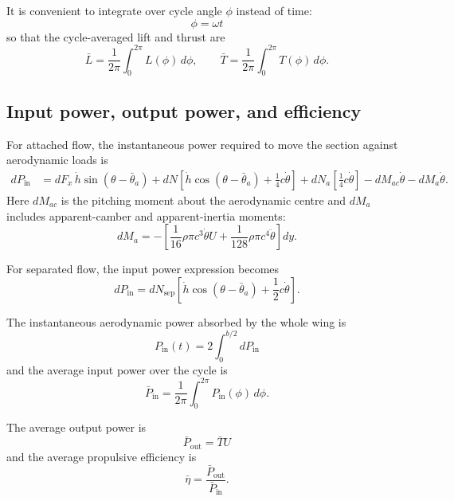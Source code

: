 \documentclass[11pt,a4paper]{article}
\begin{document}
It is convenient to integrate over cycle angle $\phi$ instead of time:
\begin{equation}
\phi=\omega t
\tag{33}\label{eq:33}
\end{equation}
so that the cycle-averaged lift and thrust are
\begin{equation}
\bar{L}=\frac{1}{2\pi}\int_{0}^{2\pi}L(\phi)\,d\phi,\qquad
\bar{T}=\frac{1}{2\pi}\int_{0}^{2\pi}T(\phi)\,d\phi.
\tag{34}\label{eq:34}
\end{equation}

\subsection{Input power, output power, and efficiency}
For attached flow, the instantaneous power required to move the section against aerodynamic loads is
\begin{align}
dP_{\text{in}}&=
dF_x\,\dot{h}\sin(\theta-\bar{\theta}_a)
+dN\left[\dot{h}\cos(\theta-\bar{\theta}_a)+\frac{1}{4}c\dot{\theta}\right]
+dN_a\left[\frac{1}{4}c\dot{\theta}\right]
-dM_{ac}\dot{\theta}-dM_a\dot{\theta}.
\tag{35}\label{eq:35}
\end{align}
Here $dM_{ac}$ is the pitching moment about the aerodynamic centre and $dM_a$ includes apparent-camber and apparent-inertia moments:
\begin{equation}
dM_a=-\left[\frac{1}{16}\rho\pi c^3\dot{\theta}U+\frac{1}{128}\rho\pi c^4\ddot{\theta}\right]dy.
\tag{36}\label{eq:36}
\end{equation}

For separated flow, the input power expression becomes
\begin{equation}
dP_{\text{in}}=dN_{\text{sep}}\left[\dot{h}\cos(\theta-\bar{\theta}_a)+\frac{1}{2}c\dot{\theta}\right].
\tag{37}\label{eq:37}
\end{equation}

The instantaneous aerodynamic power absorbed by the whole wing is
\begin{equation}
P_{\text{in}}(t)=2\int_{0}^{b/2}dP_{\text{in}}
\tag{38}\label{eq:38}
\end{equation}
and the average input power over the cycle is
\begin{equation}
\bar{P}_{\text{in}}=\frac{1}{2\pi}\int_{0}^{2\pi}P_{\text{in}}(\phi)\,d\phi.
\tag{39}\label{eq:39}
\end{equation}

The average output power is
\begin{equation}
\bar{P}_{\text{out}}=\bar{T}U
\tag{40}\label{eq:40}
\end{equation}
and the average propulsive efficiency is
\begin{equation}
\bar{\eta}=\frac{\bar{P}_{\text{out}}}{\bar{P}_{\text{in}}}.
\tag{41}\label{eq:41}
\end{equation}
\end{document}
